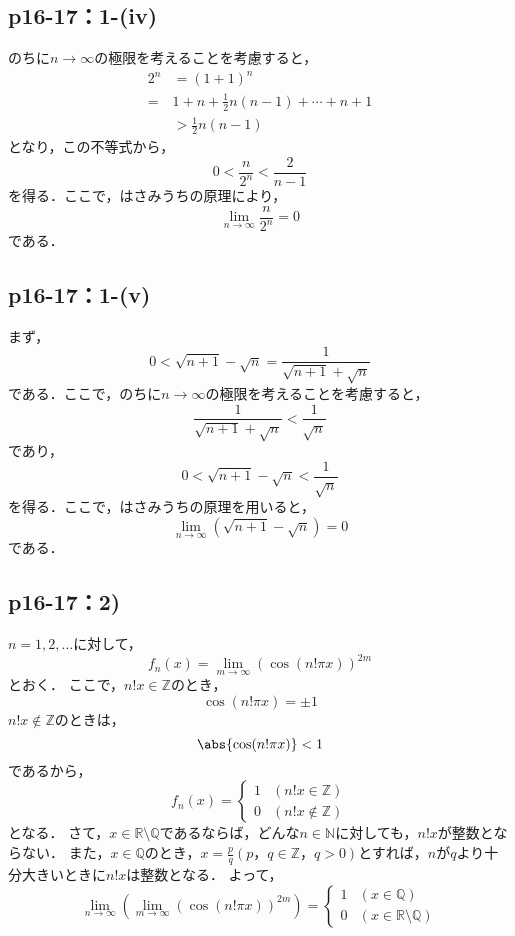 \documentclass[a4paper,10pt,fleqn]{ltjsarticle}
\begin{document}
\subsection*{p16-17：1-(iv)}
\begin{tleftbar}
    のちに$n \to \infty$の極限を考えることを考慮すると，
    \begin{align*}
        2^n &= (1+1)^n \\
        =& 1+n +\frac{1}{2} n(n-1)+ \cdots +n+1 \\
        & > \frac{1}{2} n(n-1)
    \end{align*}
    となり，この不等式から，
    \[
        0< \frac{n}{2^n} < \frac{2}{n-1}
    \]
    を得る．ここで，はさみうちの原理により，
    \[
        \lim_{n \to \infty} \frac{n}{2^n}=0
    \]
    である．
\end{tleftbar}

\subsection*{p16-17：1-(v)}
\begin{tleftbar}
    まず，
    \[
       0<\sqrt{n+1} - \sqrt{n} = \frac{1}{\sqrt{n+1} + \sqrt{n}}
    \]
    である．ここで，のちに$n \to \infty$の極限を考えることを考慮すると，
    \[
    \frac{1}{\sqrt{n+1} + \sqrt{n}} < \frac{1}{\sqrt{n}} 
    \]
    であり，
    \[
        0< \sqrt{n+1} - \sqrt{n} <\frac{1}{\sqrt{n}}
    \]
    を得る．ここで，はさみうちの原理を用いると，
    \[
        \lim_{n \to \infty} (\sqrt{n+1} - \sqrt{n} )=0
    \]
    である．
\end{tleftbar}

\subsection*{p16-17：2)}

$n=1,2,\ldots$に対して，
\[
	f_{n} (x)=\lim_{m \to \infty} (\cos (n! \pi x)) ^{2m}
\]
とおく．
ここで，$n!x \in \mathbb{Z}$のとき，
\[
	\cos (n! \pi x)=\pm 1
\]
$n!x \notin \mathbb{Z}$のときは，
\[
	\abs{\cos (n! \pi x)}<1
\]
であるから，
\[
	f_{n} (x)=
	\begin{cases}
		1 &(n!x \in \mathbb{Z}) \\
		0 & (n!x \notin \mathbb{Z})
	\end{cases}
\]
となる．
さて，$x \in \mathbb{R} \setminus \mathbb{Q}$であるならば，どんな$n \in \mathbb{N}$に対しても，$n! x$が整数とならない．
また，$x \in \mathbb{Q}$のとき，$ x=\frac{p}{q}(p，q \in \mathbb{Z}，q>0)$とすれば，$n$が$q$より十分大きいときに$n!x$は整数となる．
よって，
\[
	\lim_{n \to \infty} \left( \lim_{m \to \infty} (\cos (n! \pi x)) ^{2m} \right)=
	\begin{cases}
		1 &(x \in \mathbb{Q}) \\
		0 & (x \in \mathbb{R} \setminus \mathbb{Q})
	\end{cases}
\]
\end{document}
